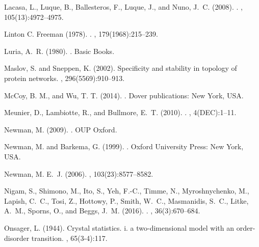 \documentclass[preprintnumbers,amsmath,amssymb,onecolumn]{revtex4}
\begin{document}
\begin{thebibliography}{99}
Lacasa, L., Luque, B., Ballesteros, F., Luque, J., and Nuno, J.~C. (2008).
.
,
  105(13):4972--4975.

{Linton C. Freeman} (1978).
.
, 179(1968):215--239.

Luria, A.~R. (1980).
.
\newblock Basic Books.

Maslov, S. and Sneppen, K. (2002).
\newblock Specificity and stability in topology of protein networks.
, 296(5569):910--913.

McCoy, B. M., and Wu, T. T. (2014).
.
\newblock Dover publications: New York, USA.

Meunier, D., Lambiotte, R., and Bullmore, E.~T. (2010).
.
, 4(DEC):1--11.

Newman, M. (2009).
.
\newblock OUP Oxford.

Newman, M. and Barkema, G. (1999).
.
\newblock Oxford University Press: New York, USA.

Newman, M. E.~J. (2006).
, 103(23):8577--8582.

Nigam, S., Shimono, M., Ito, S., Yeh, F.-C., Timme, N., Myroshnychenko, M.,
  Lapish, C.~C., Tosi, Z., Hottowy, P., Smith, W.~C., Masmanidis, S.~C., Litke,
  A.~M., Sporns, O., and Beggs, J.~M. (2016).
.
, 36(3):670--684.

Onsager, L. (1944).
\newblock Crystal statistics. i. a two-dimensional model with an order-disorder
  transition.
, 65(3-4):117.


\end{thebibliography}
\end{document}
